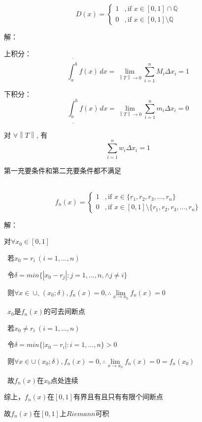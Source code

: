\begin{eg}
\noindent {} 
\[ D(x) = 
\begin{cases} 
    1 & ,\text{if } x \in  [0,1] \cap \mathbb{Q} \\ 
    0 & ,\text{if } x \in [0,1]\setminus \mathbb{Q} 
\end{cases} \]
\end{eg}
\noindent 解：
\par
上积分：
\[\overline{\int_{a}^{b}} f(x) \,dx = \lim_{\left\lVert T\right\rVert  \to 0} \sum_{i = 1}^{n} M_{i}\Delta x_{i} = 1\]
\par
下积分：
\[\underline{\int_{a}^{b}} f(x) \,dx = \lim_{\left\lVert T\right\rVert  \to 0} \sum_{i = 1}^{n} m_{i}\Delta x_{i} = 0\]
\par
对 $\forall\left\lVert T\right\rVert$, 有
\[\sum_{i = 1}^{n} w_{i}\Delta x_{i} = 1\]
\par
第一充要条件和第二充要条件都不满足
\\ \hspace*{\fill}\\
\begin{eg}
\[ f_{n}(x) = 
\begin{cases} 
    1 & ,\text{if } x \in \{r_{1},r_{2},r_{3},\dots,r_{n}\}\\ 
    0 & ,\text{if } x \in [0,1]\setminus \{r_{1},r_{2},r_{3},\dots,r_{n}\}
\end{cases} \]
\end{eg}
\noindent 解：
\par
对$\forall x_{0} \in [0,1]$
\par
{} \ 若$x_{0} = r_{i} \ (i=1,\dots,n)$
\par
\quad \ 令$\delta = min\{\left\lvert x_{0}-r_{j}\right\rvert :j = 1,\dots,n,\land j\neq i\}$
\par
\quad \ 则$\forall x \in \cup _{\circ}(x_{0};\delta ) , f_{n}(x) = 0 ,\therefore \lim \limits_{x \to x_{0}}f_{n}(x)= 0$
\par
\quad \ $x_{0}$是$f_{n}(x)$的可去间断点
\par
{} \ 若$x_{0} \neq r_{i} \ (i=1,\dots,n)$
\par
\quad \ 令$\delta = min\{\left\lvert x_{0}-r_{i}\right\rvert :i = 1,\dots,n\} > 0$
\par
\quad \ 则$\forall x \in \cup(x_{0};\delta ) , f_{n}(x) = 0 ,\therefore \lim \limits_{x \to x_{0}}f_{n}(x)= 0 = f_{n}(x_{0})$
\par
\quad \ 故$f_{n}(x)$在$x_{0}$点处连续
\par
综上，$f_{n}(x)$在$[0,1]$有界且有且只有有限个间断点
\par
故$f_{n}(x)$在$[0,1]$上$Riemann$可积


